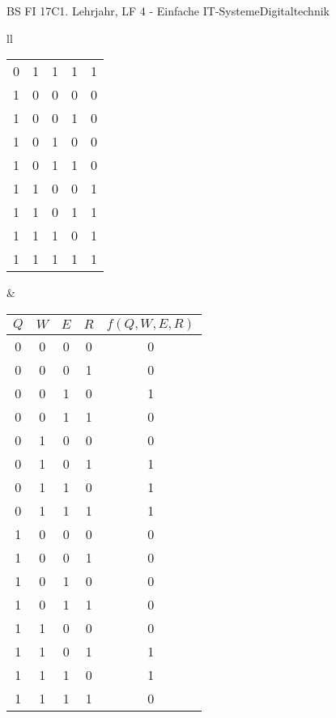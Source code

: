 \documentclass[oneside,openany,headings=optiontotoc,11pt,numbers=noenddot]{scrreprt}
\begin{document}
\begin{worksheet}{BS FI 17C}{1. Lehrjahr, LF 4 - Einfache IT-Systeme}{Digitaltechnik}
\begin{framed}
\begin{tabular}{ll}
\begin{tabularx}{0.45\textwidth}{c|c|c|c|c}
					0 & 1 & 1 & 1 & 1\\
					1 & 0 & 0 & 0 & 0\\
					1 & 0 & 0 & 1 & 0\\
					1 & 0 & 1 & 0 & 0\\
					1 & 0 & 1 & 1 & 0\\
					1 & 1 & 0 & 0 & 1\\
					1 & 1 & 0 & 1 & 1\\
					1 & 1 & 1 & 0 & 1\\
					1 & 1 & 1 & 1 & 1
				\end{tabularx} &
				\begin{tabularx}{0.45\textwidth}{c|c|c|c|c}
					\(Q\) & \(W\) & \(E\) & \(R\) & \(f(Q, W, E, R)\)\\
					\hline
					0 & 0 & 0 & 0 & 0\\
					0 & 0 & 0 & 1 & 0\\
					0 & 0 & 1 & 0 & 1\\
					0 & 0 & 1 & 1 & 0\\
					0 & 1 & 0 & 0 & 0\\
					0 & 1 & 0 & 1 & 1\\
					0 & 1 & 1 & 0 & 1\\
					0 & 1 & 1 & 1 & 1\\
					1 & 0 & 0 & 0 & 0\\
					1 & 0 & 0 & 1 & 0\\
					1 & 0 & 1 & 0 & 0\\
					1 & 0 & 1 & 1 & 0\\
					1 & 1 & 0 & 0 & 0\\
					1 & 1 & 0 & 1 & 1\\
					1 & 1 & 1 & 0 & 1\\
					1 & 1 & 1 & 1 & 0
				\end{tabularx}
			\end{tabular}
			
		\end{framed}
	\end{worksheet}
\end{document}
